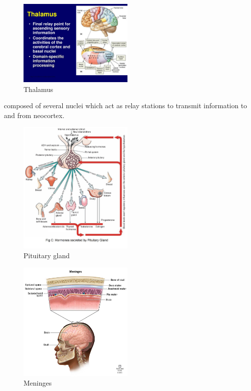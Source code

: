 \documentclass{article}
\begin{document}
    \begin{figure}[H]
    \centering
    \includegraphics[width=0.5\textwidth]{assets/thalamus.png}
    \caption{Thalamus}
    \end{figure}
    
    \noindent composed of several nuclei which act as relay stations to transmit information to and from neocortex.
    
    \begin{figure}[H]
    \centering
    \includegraphics[width=0.5\textwidth]{assets/pituitary.png}
    \caption{Pituitary gland}
    \end{figure}
    
    \begin{figure}[H]
    \centering
    \includegraphics[width=0.5\textwidth]{assets/menings.png}
    \caption{Meninges}
    \end{figure}
    
\end{document}
